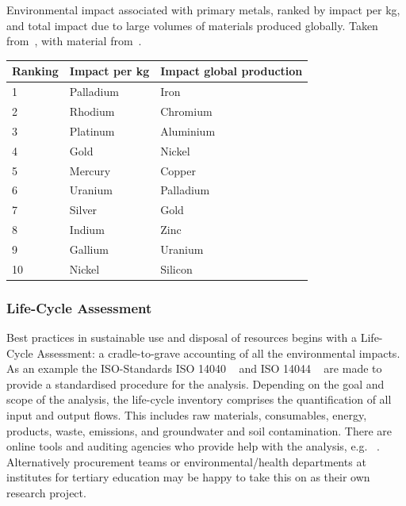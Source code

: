 \documentclass[../SustainableHEP.tex]{subfiles}
\begin{document}
{\centering
{}
\captionsetup{type=table}
\caption[Environmental impact associated with primary metals]{Environmental impact associated with primary metals, ranked by impact per kg, and total impact due to large volumes of materials produced globally.  Taken from~\cite{EURMIS}, with material from~\cite{UNEP2010}.}
\label{tab:MetalImpact}
\begin{tabular}{@{}lll@{}}\toprule
Ranking& Impact per kg & 
Impact global production \\ 
\midrule
1 & Palladium & Iron \\
2 & Rhodium & Chromium \\
3 & Platinum & Aluminium \\
4 & Gold & Nickel \\
5 & Mercury & Copper \\
6 & Uranium & Palladium \\
7 & Silver & Gold \\
8& Indium & Zinc \\
9 & Gallium & Uranium \\
10 & Nickel & Silicon \\

\bottomrule
\end{tabular}}


\subsubsection{Life-Cycle Assessment}

Best practices in sustainable use and disposal of resources begins with a Life-Cycle Assessment: a cradle-to-grave accounting of all the environmental impacts.  As an example the ISO-Standards ISO 14040 ~\cite{ISO14040} and ISO 14044 ~\cite{ISO14044} are made to provide a standardised procedure for the analysis. Depending on the goal and scope of the analysis, the life-cycle inventory comprises the quantification of all input and output flows. This includes raw materials, consumables, energy, products, waste, emissions, and groundwater and soil contamination. There are online tools and auditing agencies who provide help with the analysis, e.g. ~\cite{ProBasSi}.  Alternatively procurement teams or environmental/health departments at institutes for tertiary education may be happy to take this on as their own research project.
\end{document}
